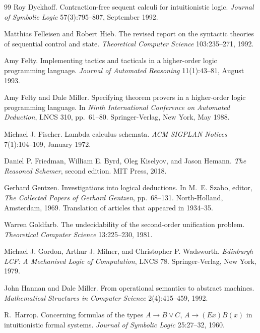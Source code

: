 \begin{thebibliography}{99}
Roy Dyckhoff.
\newblock Contraction-free sequent calculi for intuitionistic logic.
\newblock \emph{Journal of Symbolic Logic} 57(3):795--807, September 1992.

Matthias Felleisen and Robert Hieb.
\newblock The revised report on the syntactic theories of sequential control and state.
\newblock \emph{Theoretical Computer Science} 103:235--271, 1992.

Amy Felty.
\newblock Implementing tactics and tacticals in a higher-order logic programming language.
\newblock \emph{Journal of Automated Reasoning} 11(1):43--81, August 1993.

Amy Felty and Dale Miller.
\newblock Specifying theorem provers in a higher-order logic programming language.
\newblock In \emph{Ninth International Conference on Automated Deduction}, LNCS 310, pp.~61--80.
  Springer-Verlag, New York, May 1988.

Michael J. Fischer.
\newblock Lambda calculus schemata.
\newblock \emph{ACM SIGPLAN Notices} 7(1):104--109, January 1972.

Daniel P. Friedman, William E. Byrd, Oleg Kiselyov, and Jason Hemann.
\newblock \emph{The Reasoned Schemer}, second edition.
\newblock MIT Press, 2018.

Gerhard Gentzen.
\newblock Investigations into logical deductions.
\newblock In M.~E. Szabo, editor, \emph{The Collected Papers of Gerhard Gentzen}, pp.~68--131.
  North-Holland, Amsterdam, 1969. Translation of articles that appeared in 1934--35.

Warren Goldfarb.
\newblock The undecidability of the second-order unification problem.
\newblock \emph{Theoretical Computer Science} 13:225--230, 1981.

Michael J. Gordon, Arthur J. Milner, and Christopher P. Wadsworth.
\newblock \emph{Edinburgh LCF: A Mechanised Logic of Computation}, LNCS 78.
\newblock Springer-Verlag, New York, 1979.

John Hannan and Dale Miller.
\newblock From operational semantics to abstract machines.
\newblock \emph{Mathematical Structures in Computer Science} 2(4):415--459, 1992.

R.~Harrop.
\newblock Concerning formulas of the types $A\rightarrow B\vee C$, $A\rightarrow(Ex)B(x)$ in
  intuitionistic formal systems.
\newblock \emph{Journal of Symbolic Logic} 25:27--32, 1960.


\end{thebibliography}
